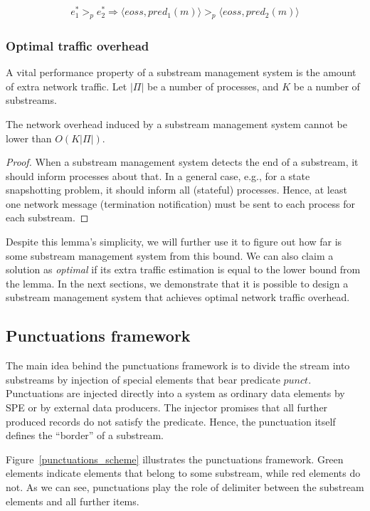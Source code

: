 \begin{align*}
e^{*}_1 >_p e^{*}_2 \Longrightarrow \langle eoss, pred_1(m)\rangle >_p \langle eoss, pred_2(m)\rangle
\end{align*}

\subsubsection{Optimal traffic overhead}

A vital performance property of a substream management system is the amount of extra network traffic. Let $|\Pi|$ be a number of processes, and $K$ be a number of substreams. 

\begin{lemma}
The network overhead induced by a substream management system cannot be lower than $O(K|\Pi|)$. 
\end{lemma}
\begin{proof}
When a substream management system detects the end of a substream, it should inform processes about that. In a general case, e.g., for a state snapshotting problem, it should inform all (stateful) processes. Hence, at least one network message (termination notification) must be sent to each process for each substream.
\end{proof}

Despite this lemma's simplicity, we will further use it to figure out how far is some substream management system from this bound. We can also claim a solution as {\em optimal} if its extra traffic estimation is equal to the lower bound from the lemma. In the next sections, we demonstrate that it is possible to design a substream management system that achieves optimal network traffic overhead.

\subsection{Punctuations framework}
\label{fs-acker-punctuations}

The main idea behind the punctuations framework is to divide the stream into substreams by injection of special elements that bear predicate $punct$. Punctuations are injected directly into a system as ordinary data elements by SPE or by external data producers. The injector promises that all further produced records do not satisfy the predicate. Hence, the punctuation itself defines the ``border'' of a substream.

Figure~\ref{punctuations_scheme} illustrates the punctuations framework. Green elements indicate elements that belong to some substream, while red elements do not. As we can see, punctuations play the role of delimiter between the substream elements and all further items.

